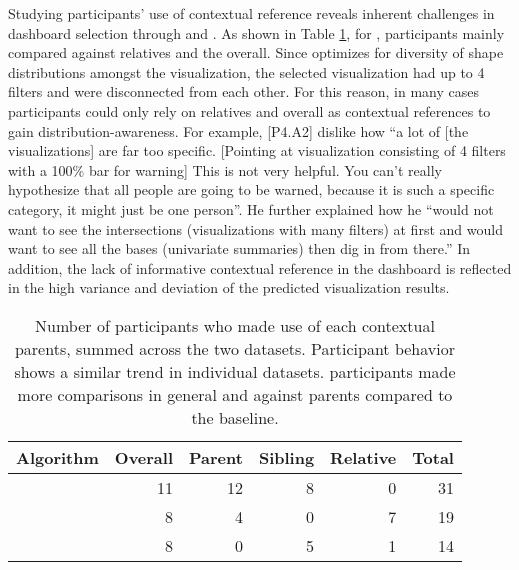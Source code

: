Studying participants' use of contextual reference reveals inherent challenges in dashboard selection through \BFS and \cluster. As shown in Table \ref{table:contextualReferenceCount}, for \cluster , participants mainly compared against relatives and the overall. Since \cluster optimizes for diversity of shape distributions amongst the visualization, the selected visualization had up to 4 filters and were disconnected from each other. For this reason, in many cases participants could only rely on relatives and overall as contextual references to gain distribution-awareness. For example, [P4.A2] dislike how ``a lot of [the visualizations] are far too specific. [Pointing at visualization consisting of 4 filters with a 100\% bar for warning] This is not very helpful. You can't really hypothesize that all people are going to be warned, because it is such a specific category, it might just be one person''. %
He further explained how he ``would not want to see the intersections (visualizations with many filters) at first and would want to see all the bases (univariate summaries) then dig in from there.'' In addition, the lack of informative contextual reference in the \cluster dashboard is reflected in the high variance and deviation of the predicted visualization results.
\begin{table}[h!]
\centering
	\begin{tabular}{l|rrrr|r}
	\hline
	 Algorithm   &   Overall &   Parent &   Sibling &   Relative &   Total \\
	\hline
	 \system     &        11 &      \cellcolor{blue!25} 12 &         8 &          0 &      \cellcolor{blue!25} 31 \\
	 \cluster     &         8 &        4 &         0 &          7 &      19 \\
	 \BFS         &         8 &        0 &         5 &          1 &      14 \\
	\hline
	\end{tabular}
\caption{Number of participants who made use of each contextual parents, summed across the two datasets. Participant behavior shows a similar trend in individual datasets. \system participants made more comparisons in general and against parents compared to the baseline.}
\label{table:contextualReferenceCount}
\end{table}
